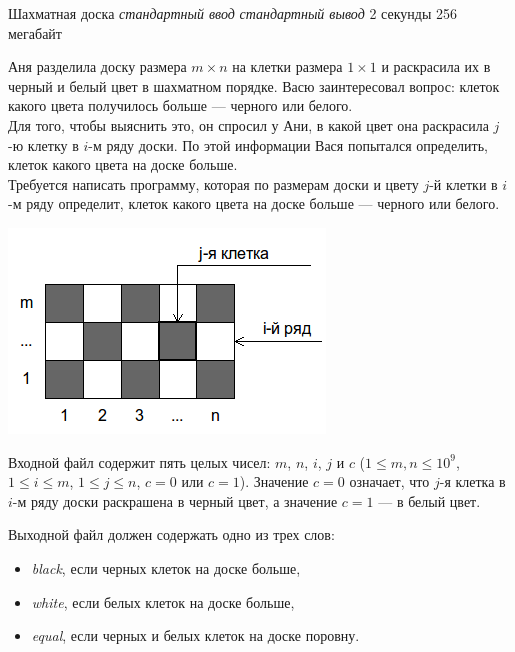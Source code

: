 \begin{problem}%
{Шахматная доска}%
{\textsl{стандартный ввод}}%
{\textsl{стандартный вывод}}%
{2 секунды}%
{256 мегабайт}{}

Аня разделила доску размера $m \times n$ на клетки размера $1 \times 1$ и раскрасила их в черный и белый цвет в шахматном порядке. Васю заинтересовал вопрос: клеток какого цвета получилось больше — черного или белого.\\

Для того, чтобы выяснить это, он спросил у Ани, в какой цвет она раскрасила $j$-ю клетку в $i$-м ряду доски. По этой информации Вася попытался определить, клеток какого цвета на доске больше.\\

Требуется написать программу, которая по размерам доски и цвету $j$-й клетки в $i$-м ряду определит, клеток какого цвета на доске больше — черного или белого.

\includegraphics[scale=0.5]{images/3.png}

\InputFile

Входной файл содержит пять целых чисел: $m$, $n$, $i$, $j$ и $c$ ($1 \le m, n \le 10^9$, $1 \le i \le m$, $1 \le j \le n$, $c = 0$ или $c = 1$). Значение $c = 0$  означает, что $j$-я клетка в $i$-м ряду доски раскрашена в черный цвет, а значение $c = 1$  — в белый цвет.

\OutputFile

Выходной файл должен содержать одно из трех слов:

\begin{itemize}
\item \textit{black}, если черных клеток на доске больше,
\item \textit{white}, если белых клеток на доске больше,
\item \textit{equal}, если черных и белых клеток на доске поровну.
\end{itemize}

\Examples

\begin{example}
%
%
%
\end{example}
\end{problem}